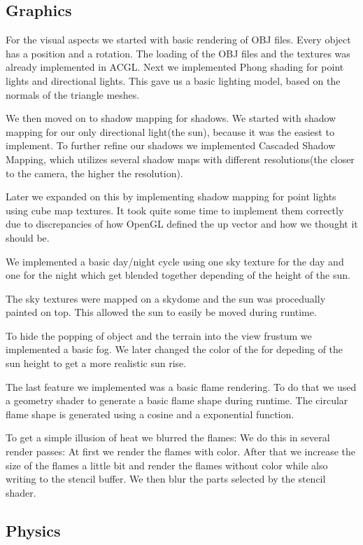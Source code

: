 \documentclass[sponsored]{acmsiggraph}
\begin{document}
\subsection{Graphics}

For the visual aspects we started with basic rendering of OBJ files. Every object has a position and a rotation.
The loading of the OBJ files and the textures was already implemented in ACGL.
Next we implemented Phong shading for point lights and directional lights.
This gave us a basic lighting model, based on the normals of the triangle meshes.

We then moved on to shadow mapping for shadows.
We started with shadow mapping for our only directional light(the sun), because it was the easiest to implement.
To further refine our shadows we implemented Cascaded Shadow Mapping, which utilizes several shadow maps with different
resolutions(the closer to the camera, the higher the resolution).

Later we expanded on this by implementing shadow mapping for point lights using cube map textures. It took quite some time to implement them correctly due to
discrepancies of how OpenGL defined the up vector and how we thought it should be.

We implemented a basic day/night cycle using one sky texture for the day and one for the night which get blended together depending of the height
of the sun.

The sky textures were mapped on a skydome and the sun was procedually painted on top. This allowed the sun to easily be moved during runtime.

To hide the popping of object and the terrain into the view frustum we implemented a basic fog.
We later changed the color of the for depeding of the sun height to get a more realistic sun rise.

The last feature we implemented was a basic flame rendering. 
To do that we used a geometry shader to generate a basic flame shape during runtime.
The circular flame shape is generated using a cosine and a exponential function.

To get a simple illusion of heat we blurred the flames:
We do this in several render passes:
At first we render the flames with color.
After that we increase the size of the flames a little bit and render the flames without color while also writing to the stencil buffer.
We then blur the parts selected by the stencil shader.

\subsection{Physics}
\end{document}

